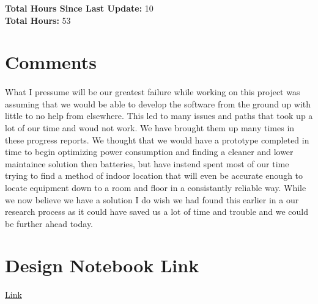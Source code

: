 \documentclass[11pt]{report}
\begin{document}
		\textbf{Total Hours Since Last Update: } 10\\
		\textbf{Total Hours: } 53

\newpage

\section*{Comments}
	\paragraph*{}
		What I pressume will be our greatest failure while working on this project was assuming that we would be able to develop the software from the ground up with little to no help from elsewhere.  This led to many issues and paths that took up a lot of our time and woud not work.  We have brought them up many times in these progress reports.  We thought that we would have a prototype completed in time to begin optimizing power consumption and finding a cleaner and lower maintaince solution then batteries, but have instend spent most of our time trying to find a method of indoor location that will even be accurate enough to locate equipment down to a room and floor in a consistantly reliable way.  While we now believe we have a solution I do wish we had found this earlier in a our research process as it could have saved us a lot of time and trouble and we could be further ahead today.

\section*{Design Notebook Link}
	\begin{center}
		\href{https://docs.google.com/document/d/1_15R62LK1jZ8SYRuCrb-5IObISIdbLSfoH2bRU7464c/edit?usp=sharing}{Link}
	\end{center}
\end{document}
